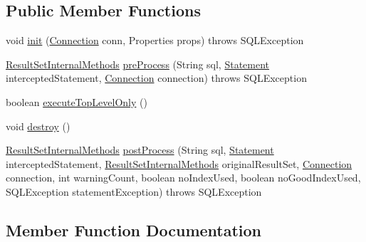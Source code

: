 \subsection*{Public Member Functions}
\begin{DoxyCompactItemize}
\item 
void \mbox{\hyperlink{classtestsuite_1_1_base_statement_interceptor_a9f780bb34bc2101037455ca81d1c2a16}{init}} (\mbox{\hyperlink{interfacecom_1_1mysql_1_1jdbc_1_1_connection}{Connection}} conn, Properties props)  throws S\+Q\+L\+Exception 
\item 
\mbox{\hyperlink{interfacecom_1_1mysql_1_1jdbc_1_1_result_set_internal_methods}{Result\+Set\+Internal\+Methods}} \mbox{\hyperlink{classtestsuite_1_1_base_statement_interceptor_aa08942c2eb76d1550322df94b28bb2cc}{pre\+Process}} (String sql, \mbox{\hyperlink{interfacecom_1_1mysql_1_1jdbc_1_1_statement}{Statement}} intercepted\+Statement, \mbox{\hyperlink{interfacecom_1_1mysql_1_1jdbc_1_1_connection}{Connection}} connection)  throws S\+Q\+L\+Exception 
\item 
boolean \mbox{\hyperlink{classtestsuite_1_1_base_statement_interceptor_a1eb3615bcd122817ef160af0a06d7e23}{execute\+Top\+Level\+Only}} ()
\item 
void \mbox{\hyperlink{classtestsuite_1_1_base_statement_interceptor_ad60c14de4fc7503095f6dd609f34a95a}{destroy}} ()
\item 
\mbox{\hyperlink{interfacecom_1_1mysql_1_1jdbc_1_1_result_set_internal_methods}{Result\+Set\+Internal\+Methods}} \mbox{\hyperlink{classtestsuite_1_1_base_statement_interceptor_a00ff902755e287c1a983e8d840ca32d5}{post\+Process}} (String sql, \mbox{\hyperlink{interfacecom_1_1mysql_1_1jdbc_1_1_statement}{Statement}} intercepted\+Statement, \mbox{\hyperlink{interfacecom_1_1mysql_1_1jdbc_1_1_result_set_internal_methods}{Result\+Set\+Internal\+Methods}} original\+Result\+Set, \mbox{\hyperlink{interfacecom_1_1mysql_1_1jdbc_1_1_connection}{Connection}} connection, int warning\+Count, boolean no\+Index\+Used, boolean no\+Good\+Index\+Used, S\+Q\+L\+Exception statement\+Exception)  throws S\+Q\+L\+Exception 
\end{DoxyCompactItemize}


\subsection{Member Function Documentation}
\mbox{\label{classtestsuite_1_1_base_statement_interceptor_ad60c14de4fc7503095f6dd609f34a95a}} 
